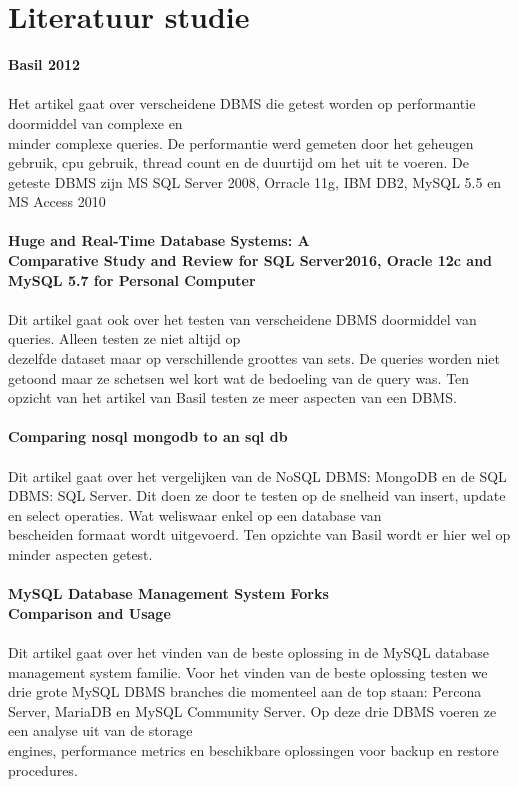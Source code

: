 \documentclass[fleqn,10pt]{artikeltin}
\begin{document}
\section{Literatuur studie}
\label{sec:LiteratuurStudie}
\textbf{Basil 2012}\\\\
Het artikel gaat over verscheidene DBMS die getest worden op performantie doormiddel van complexe en \\minder complexe queries. De performantie werd gemeten door het geheugen gebruik, cpu gebruik, thread count en de duurtijd om het uit te voeren. De geteste DBMS zijn MS SQL Server 2008, Orracle 11g, IBM DB2, MySQL 5.5 en MS Access 2010\\\\
\textbf{Huge and Real-Time Database Systems: A \\Comparative Study and Review for SQL Server2016, Oracle 12c and MySQL 5.7 for Personal Computer}\\\\
Dit artikel gaat ook over het testen van verscheidene DBMS doormiddel van queries. Alleen testen ze niet altijd op \\dezelfde dataset maar op verschillende groottes van sets. De queries worden niet getoond maar ze schetsen wel kort wat de bedoeling van de query was. Ten opzicht van het artikel van Basil testen ze meer aspecten van een DBMS.\\\\
\textbf{Comparing nosql mongodb to an sql db}\\\\
Dit artikel gaat over het vergelijken van de NoSQL DBMS: MongoDB en de SQL DBMS: SQL Server. Dit doen ze door te testen op de snelheid van insert, update en select operaties. Wat weliswaar enkel op een database van \\bescheiden formaat wordt uitgevoerd. Ten opzichte van Basil wordt er hier wel op minder aspecten getest.\\\\
\textbf{MySQL Database Management System Forks \\Comparison and Usage}\\\\
Dit artikel gaat over het vinden van de beste oplossing in de MySQL database management system familie. Voor het vinden van de beste oplossing testen we drie grote MySQL DBMS branches die momenteel aan de top staan: Percona Server, MariaDB en MySQL Community Server. Op deze drie DBMS voeren ze een analyse uit van de storage \\engines, performance metrics en beschikbare oplossingen voor backup en restore procedures.\\\\
\end{document}
